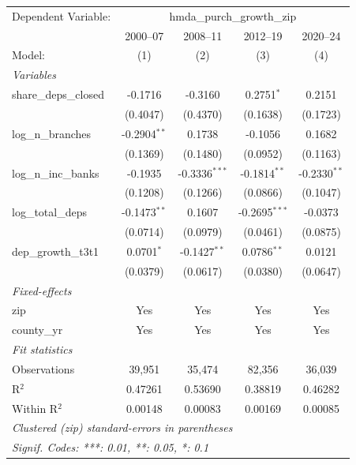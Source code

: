 \begingroup
\centering
\begin{tabular}{lcccc}
   \tabularnewline \midrule \midrule
   Dependent Variable: & \multicolumn{4}{c}{hmda\_purch\_growth\_zip}\\
                         & 2000–07        & 2008–11         & 2012–19         & 2020–24 \\   
   Model:                & (1)            & (2)             & (3)             & (4)\\  
   \midrule
   \emph{Variables}\\
   share\_deps\_closed   & -0.1716        & -0.3160         & 0.2751$^{*}$    & 0.2151\\   
                         & (0.4047)       & (0.4370)        & (0.1638)        & (0.1723)\\   
   log\_n\_branches      & -0.2904$^{**}$ & 0.1738          & -0.1056         & 0.1682\\   
                         & (0.1369)       & (0.1480)        & (0.0952)        & (0.1163)\\   
   log\_n\_inc\_banks    & -0.1935        & -0.3336$^{***}$ & -0.1814$^{**}$  & -0.2330$^{**}$\\   
                         & (0.1208)       & (0.1266)        & (0.0866)        & (0.1047)\\   
   log\_total\_deps      & -0.1473$^{**}$ & 0.1607          & -0.2695$^{***}$ & -0.0373\\   
                         & (0.0714)       & (0.0979)        & (0.0461)        & (0.0875)\\   
   dep\_growth\_t3t1     & 0.0701$^{*}$   & -0.1427$^{**}$  & 0.0786$^{**}$   & 0.0121\\   
                         & (0.0379)       & (0.0617)        & (0.0380)        & (0.0647)\\   
   \midrule
   \emph{Fixed-effects}\\
   zip                   & Yes            & Yes             & Yes             & Yes\\  
   county\_yr            & Yes            & Yes             & Yes             & Yes\\  
   \midrule
   \emph{Fit statistics}\\
   Observations          & 39,951         & 35,474          & 82,356          & 36,039\\  
   R$^2$                 & 0.47261        & 0.53690         & 0.38819         & 0.46282\\  
   Within R$^2$          & 0.00148        & 0.00083         & 0.00169         & 0.00085\\  
   \midrule \midrule
   \multicolumn{5}{l}{\emph{Clustered (zip) standard-errors in parentheses}}\\
   \multicolumn{5}{l}{\emph{Signif. Codes: ***: 0.01, **: 0.05, *: 0.1}}\\
\end{tabular}
\par\endgroup
